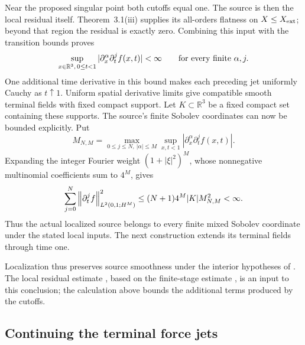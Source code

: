Near the proposed singular point both cutoffs equal one. The source is
then the local residual itself. Theorem~3.1(iii) supplies its all-orders
flatness on \(X\le X_{\rm ext}\); beyond that region the residual is
exactly zero. Combining this input with the transition bounds proves
\begin{equation}
 \sup_{x\in\mathbb R^3,\,0\le t<1}|\partial_x^\alpha\partial_t^j f(x,t)|<\infty
 \qquad\hbox{for every finite }\alpha,j.
 \label{r:eq:localized-source-jets}
\end{equation}
One additional time derivative in this bound makes each preceding jet
uniformly Cauchy as \(t\uparrow1\). Uniform spatial derivative limits
give compatible smooth terminal fields with fixed compact support.
Let \(K\subset\mathbb R^3\) be a fixed compact set containing these supports.
The source's finite Sobolev coordinates can now be bounded explicitly.
Put
\[
 M_{N,M}=\max_{0\le j\le N,\ |\alpha|\le M}
 \sup_{x,t<1}|\partial_x^\alpha\partial_t^j f(x,t)|.
\]
Expanding the integer Fourier weight \((1+|\xi|^2)^M\), whose
nonnegative multinomial coefficients sum to \(4^M\), gives
\begin{equation}
 \sum_{j=0}^N\left\lVert \partial_t^jf\right\rVert_{L^2(0,1;H^M)}^2
 \le (N+1)4^M|K|M_{N,M}^2<\infty.
 \label{r:eq:localized-source-rectangle}
\end{equation}
Thus the actual localized source belongs to every finite mixed Sobolev
coordinate under the stated local inputs. The next construction extends
its terminal fields through time one.

Localization thus preserves source smoothness under the interior
hypotheses of \cite[Theorem~3.1]{openai-paper}. The local residual
estimate \cite[(3.4)]{openai-paper}, based on the finite-stage estimate
\cite[(9.18)]{openai-paper}, is an input to this conclusion; the
calculation above bounds the additional terms produced by the cutoffs.

\subsection{Continuing the terminal force jets}
